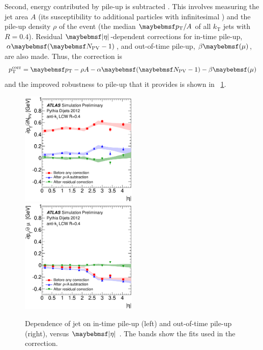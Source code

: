 \begin{description}
	Second, energy contributed by pile-up is subtracted \cite{Jets:PileupCorrection:2012}.
	This involves measuring the jet area $A$ (its susceptibility to additional particles 
	with infinitesimal \pt) and the pile-up density $\rho$ of the event (the median $\pt/A$ 
	of all $k_{\text{T}}$ jets with $R=0.4$). Residual $\mods{\eta}$-dependent corrections 
	for in-time pile-up, $\alpha \parenths{\npv - 1}$, and out-of-time pile-up, 
	$\beta \parenths{\mu}$, are also made. Thus, the correction is
	\begin{equation}
		p_{\text{T}}^{\text{corr}} = \pt - \rho A - \alpha \parenths{\npv - 1} 
		- \beta \parenths{\mu}
	\end{equation}
	and the improved robustness to pile-up that it provides is shown in 
	\Figure~\ref{fig:objects:jet_pu_corr}.

	\begin{figure}[t]
		\includegraphics[width=0.495\textwidth]{tex/selection/jet_pu_npv}
		\hfill
		\includegraphics[width=0.495\textwidth]{tex/selection/jet_pu_mu}
		\caption{Dependence of jet \pt on in-time pile-up (left) and out-of-time pile-up 
		(right), versus $\mods{\eta}$ \cite{Jets:PileupCorrection:2012}. The bands show 
		the fits used in the correction.}
		\label{fig:objects:jet_pu_corr}
	\end{figure}


\end{description}
